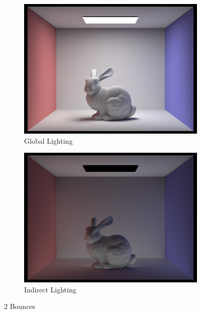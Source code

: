 \documentclass{article}
\begin{document}
\begin{figure}[htb!]
\begin{subfigure}[h]{0.4\textwidth}
\includegraphics[width=\textwidth]{task4/CBbunny_global_1024_2.png}
\caption{Global Lighting}
\end{subfigure}
\hfill\vrule\hfill
\begin{subfigure}[h]{0.4\textwidth}
\includegraphics[width=\textwidth]{task4/CBbunny_indirect_1024_2.png}
\caption{Indirect Lighting}
\end{subfigure}%

\caption[f2]{2 Bounces}
\end{figure}
\end{document}
